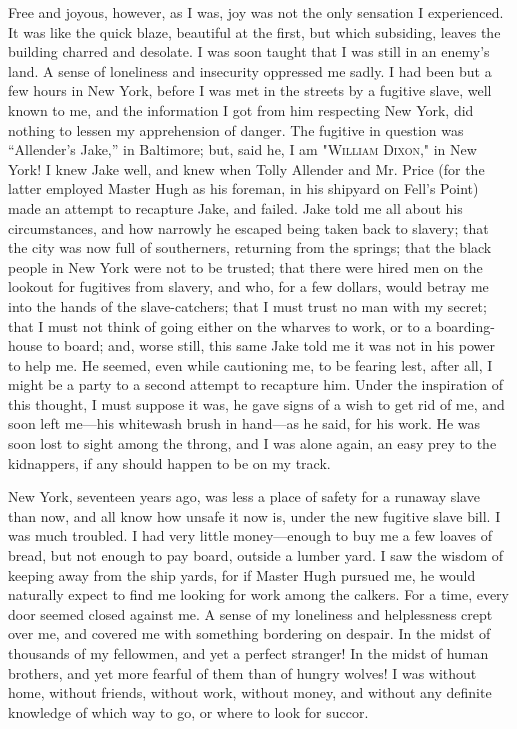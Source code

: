 Free and joyous, however, as I was, joy was not the only sensation I
experienced. It was like the quick blaze, beautiful at the first, but
which subsiding, leaves the building charred and desolate. I was soon
taught that I was still in an enemy's land. A sense of loneliness and
insecurity oppressed me sadly. I had been but a few hours in New York,
before I was met in the streets by a fugitive slave, well known to me,
and the information I got from him respecting New York, did nothing to
lessen my apprehension of danger. The fugitive in question was
``Allender's Jake,'' in Baltimore; but, said he, I am "\textsc{William
Dixon}," in New York! I knew Jake well, and knew when Tolly Allender and
Mr. Price (for the latter employed Master Hugh as his foreman, in his
shipyard on Fell's Point) made an attempt to recapture Jake, and failed.
Jake told me all about his circumstances, and how narrowly he {}escaped
being taken back to slavery; that the city was now full of southerners,
returning from the springs; that the black people in New York were not
to be trusted; that there were hired men on the lookout for fugitives
from slavery, and who, for a few dollars, would betray me into the hands
of the slave-catchers; that I must trust no man with my secret; that I
must not think of going either on the wharves to work, or to a
boarding-house to board; and, worse still, this same Jake told me it was
not in his power to help me. He seemed, even while cautioning me, to be
fearing lest, after all, I might be a party to a second attempt to
recapture him. Under the inspiration of this thought, I must suppose it
was, he gave signs of a wish to get rid of me, and soon left me---his
whitewash brush in hand---as he said, for his work. He was soon lost to
sight among the throng, and I was alone again, an easy prey to the
kidnappers, if any should happen to be on my track.

New York, seventeen years ago, was less a place of safety for a runaway
slave than now, and all know how unsafe it now is, under the new
fugitive slave bill. I was much troubled. I had very little
money---enough to buy me a few loaves of bread, but not enough to pay
board, outside a lumber yard. I saw the wisdom of keeping away from the
ship yards, for if Master Hugh pursued me, he would naturally expect to
find me looking for work among the calkers. For a time, every door
seemed closed against me. A sense of my loneliness and helplessness
crept over me, and covered me with something bordering on despair. In
the midst of thousands of my {}fellowmen, and yet a perfect stranger! In
the midst of human brothers, and yet more fearful of them than of hungry
wolves! I was without home, without friends, without work, without
money, and without any definite knowledge of which way to go, or where
to look for succor.

